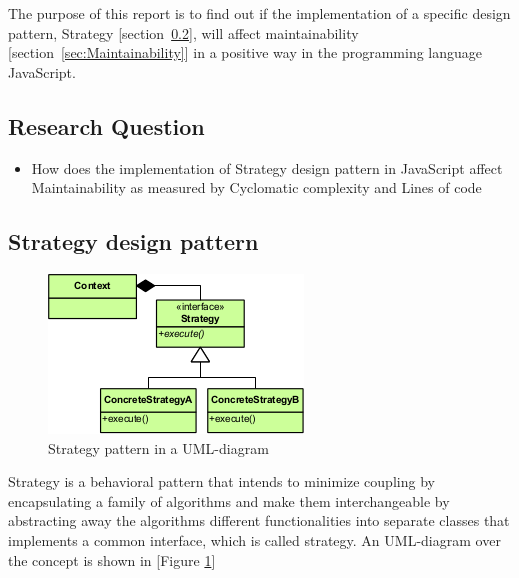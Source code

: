 \documentclass[conference, a4paper]{IEEEtran}
\begin{document}
The purpose of this report is to find out if the implementation of a specific design pattern, Strategy [section~\ref{sec:Strategy}], will affect maintainability [section~\ref{sec:Maintainability}] in a positive way in the programming language JavaScript.

\subsection{Research Question}
\begin{itemize}
	\item How does the implementation of Strategy design pattern in JavaScript affect Maintainability as measured by Cyclomatic complexity and Lines of code
\end{itemize}
\subsection{Strategy design pattern}
\label{sec:Strategy}
\begin{figure}[ht!]
	\centering
	\includegraphics[scale=0.7]{Strategy_Pattern_in_UML.png}
	\caption{Strategy pattern in a UML-diagram}
	\label{fig:Strategy}
\end{figure}
Strategy is a behavioral pattern that intends to minimize coupling by encapsulating a family of algorithms and make them interchangeable by abstracting away the algorithms different functionalities into separate classes that implements a common interface, which is called strategy. An UML-diagram over the concept is shown in [Figure \ref{fig:Strategy}]
\end{document}
